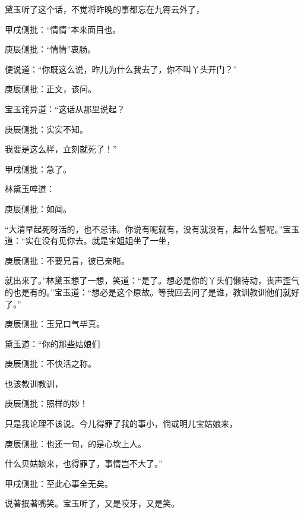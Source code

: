 \begin{parag}
    黛玉听了这个话，不觉将昨晚的事都忘在九霄云外了，\begin{note}甲戌侧批：“情情”本来面目也。\end{note}\begin{note}庚辰侧批：“情情”衷肠。\end{note}便说道：“你既这么说，昨儿为什么我去了，你不叫丫头开门？”\begin{note}庚辰侧批：正文，该问。\end{note}宝玉诧异道：“这话从那里说起？\begin{note}庚辰侧批：实实不知。\end{note}我要是这么样，立刻就死了！”\begin{note}甲戌侧批：急了。\end{note}林黛玉啐道：\begin{note}庚辰侧批：如闻。\end{note}“大清早起死呀活的，也不忌讳。你说有呢就有，没有就没有，起什么誓呢。”宝玉道：“实在没有见你去。就是宝姐姐坐了一坐，\begin{note}庚辰侧批：不要兄言，彼已亲睹。\end{note}就出来了。”林黛玉想了一想，笑道：“是了。想必是你的丫头们懒待动，丧声歪气的也是有的。”宝玉道：“想必是这个原故。等我回去问了是谁，教训教训他们就好了。”\begin{note}庚辰侧批：玉兄口气毕真。\end{note}黛玉道：“你的那些姑娘们\begin{note}庚辰侧批：不快活之称。\end{note}也该教训教训，\begin{note}庚辰侧批：照样的妙！\end{note}只是我论理不该说。今儿得罪了我的事小，倘或明儿宝姑娘来，\begin{note}庚辰侧批：也还一句，的是心坎上人。\end{note}什么贝姑娘来，也得罪了，事情岂不大了。”\begin{note}甲戌侧批：至此心事全无矣。\end{note}说著抿著嘴笑。宝玉听了，又是咬牙，又是笑。
\end{parag}


